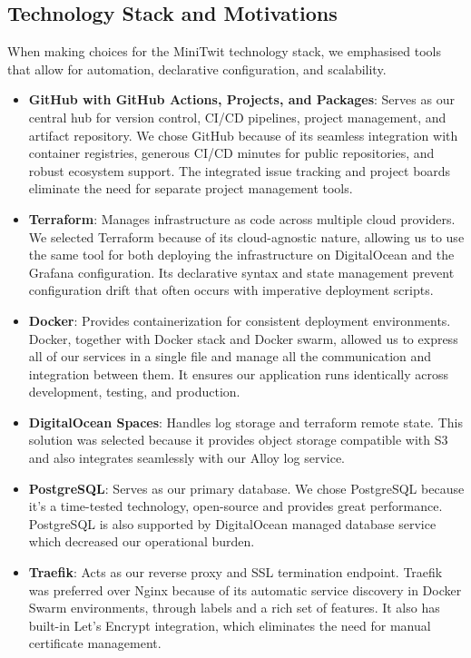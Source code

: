 \subsection{Technology Stack and Motivations}

When making choices for the MiniTwit technology stack, we emphasised tools that allow for automation, declarative configuration, and scalability.

\begin{itemize}
    \item \textbf{GitHub with GitHub Actions, Projects, and Packages}: Serves as our central hub for version control, CI/CD pipelines, project management, and artifact repository. We chose GitHub because of its seamless integration with container registries, generous CI/CD minutes for public repositories, and robust ecosystem support. The integrated issue tracking and project boards eliminate the need for separate project management tools.

    \item \textbf{Terraform}: Manages infrastructure as code across multiple cloud providers. We selected Terraform because of its cloud-agnostic nature, allowing us to use the same tool for both deploying the infrastructure on DigitalOcean and the Grafana configuration. Its declarative syntax and state management prevent configuration drift that often occurs with imperative deployment scripts.

    \item \textbf{Docker}: Provides containerization for consistent deployment environments. Docker, together with Docker stack and Docker swarm, allowed us to express all of our services in a single file and manage all the communication and integration between them. It ensures our application runs identically across development, testing, and production.

    \item \textbf{DigitalOcean Spaces}: Handles log storage and terraform remote state. This solution was selected because it provides object storage compatible with S3 and also integrates seamlessly with our Alloy log service.

    \item \textbf{PostgreSQL}: Serves as our primary database. We chose PostgreSQL because it's a time-tested technology, open-source and provides great performance. PostgreSQL is also supported by DigitalOcean managed database service which decreased our operational burden.

    \item \textbf{Traefik}: Acts as our reverse proxy and SSL termination endpoint. Traefik was preferred over Nginx because of its automatic service discovery in Docker Swarm environments, through labels and a rich set of features. It also has built-in Let's Encrypt integration, which eliminates the need for manual certificate management.


\end{itemize}

